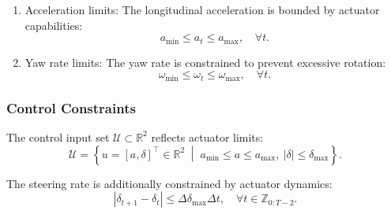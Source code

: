 \documentclass[pdflatex,sn-mathphys,Numbered]{sn-jnl}
\numberwithin{equation}{section}
\begin{document}
\begin{enumerate}
		\item[iv)] {Acceleration limits:}  
		The longitudinal acceleration is bounded by actuator capabilities:
		\begin{equation}
			a_{\min} \le a_t \le a_{\max}, \quad \forall t.
			\label{equ:sec2_acceleration_limits}
		\end{equation}
		
		\item[v)] {Yaw rate limits:}  
		The yaw rate is constrained to prevent excessive rotation:
		\begin{equation}
			\omega_{\min} \le \omega_t \le \omega_{\max}, \quad \forall t.
			\label{equ:sec2_yaw_rate_limits}
		\end{equation}
	\end{enumerate}
	
	\subsubsection{Control Constraints}
	The control input set \( \mathcal{U} \subset \mathbb{R}^2 \) reflects actuator limits:
	\begin{equation}
		\mathcal{U} = \left\{ u = [a, \delta]^\top \in \mathbb{R}^2 \; \middle| \;
		a_{\min} \leq a \leq a_{\max},\ |\delta| \leq \delta_{\max}
		\right\}.
		\label{equ:sec2_control_input_set}
	\end{equation}
	
	The steering rate is additionally constrained by actuator dynamics:
	\begin{equation}
		|\delta_{t+1} - \delta_t| \leq \Delta\delta_{\max} \Delta t, \quad \forall t \in \mathbb{Z}_{0:T-2}.
		\label{equ:sec2_steering_rate_limit}
	\end{equation}
	
\end{document}
